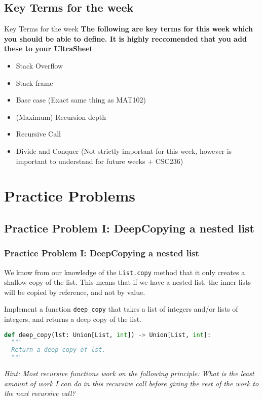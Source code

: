 \documentclass[hyperref={colorlinks,citecolor=blue,linkcolor=blue,urlcolor=blue}]{beamer}
\begin{document}
\subsection{Key Terms for the week}

\begin{frame}{Key Terms for the week}
  \textbf<overlay specification>{The following are key terms for this week which you should be able to define. It is highly reccomended that you add these to your UltraSheet\texttrademark{}}

  \begin{itemize}
  \item Stack Overflow
  \item Stack frame
  \item Base case (Exact same thing as MAT102)
  \item (Maximum) Recursion depth
  \item Recursive Call
  \item Divide and Conquer (Not strictly important for this week, however is important to understand for future weeks + CSC236)
  \end{itemize}
\end{frame}

\section{Practice Problems}
\subsection{Practice Problem I: DeepCopying a nested list}
\begin{frame}[fragile]
  \frametitle{Practice Problem I: DeepCopying a nested list}
  We know from our knowledge of the \texttt{List.copy} method that it only creates a shallow copy of the list. This means that if we have a nested list, the inner lists will be copied by reference, and not by value.

  Implement a function \texttt{deep\_copy} that takes a list of integers and/or lists of integers, and returns a deep copy of the list.
  \begin{lstlisting}[language=Python, caption=Method signature of the deep\_copy method, style=mystyle]
def deep_copy(lst: Union[List, int]) -> Union[List, int]:
  """
  Return a deep copy of lst.
  """
  \end{lstlisting}

  \textit{Hint: Most recursive functions work on the following principle: What is the least amount of work I can do in this recursive call before giving the rest of the work to the next recursive call?}

\end{frame}
\end{document}
